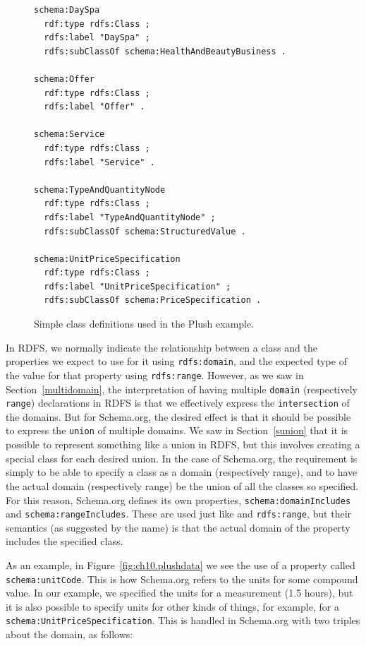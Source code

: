 \begin{figure}
\begin{lstlisting}
schema:DaySpa
  rdf:type rdfs:Class ;
  rdfs:label "DaySpa" ;
  rdfs:subClassOf schema:HealthAndBeautyBusiness .

schema:Offer
  rdf:type rdfs:Class ;
  rdfs:label "Offer" .
  
schema:Service
  rdf:type rdfs:Class ;
  rdfs:label "Service" .
  
schema:TypeAndQuantityNode
  rdf:type rdfs:Class ;
  rdfs:label "TypeAndQuantityNode" ;
  rdfs:subClassOf schema:StructuredValue .

schema:UnitPriceSpecification
  rdf:type rdfs:Class ;
  rdfs:label "UnitPriceSpecification" ;
  rdfs:subClassOf schema:PriceSpecification .
\end{lstlisting} 

    \caption{Simple class definitions used in the Plush example. }
    \label{fig:ch10.s.o.def}
\end{figure}

In RDFS, we normally indicate the relationship between a class and the properties
we expect to use for it using \texttt{rdfs:domain}, and the expected 
type of the value for that property using \texttt{rdfs:range}.  However, as we 
saw in Section~\ref{multidomain}, the interpretation of having multiple 
\texttt{domain} (respectively \texttt{range}) declarations in RDFS is that 
we effectively express the \texttt{intersection} of the domains.  But for 
Schema.org, the desired effect is that it should be possible to express the 
\texttt{union} of multiple domains.  We saw in Section~\ref{sunion} that it is 
possible to represent something like a union in RDFS, but this involves
creating a special class for each desired union.  In the case of Schema.org, 
the requirement is simply to be able to specify a class as a domain (respectively 
range), and to have the actual domain (respectively range) be the union of all 
the classes so specified.  For this reason, Schema.org defines its own 
properties, \texttt{schema:domainIncludes} and \texttt{schema:rangeIncludes}. 
These are used just like  and \texttt{rdfs:range}, but 
their semantics (as suggested by the name) is that the actual domain of 
the property includes the specified class. 

As an example, in Figure~\ref{fig:ch10.plushdata} we see the use of a property 
called \texttt{schema:unitCode}.  This is how Schema.org refers to the units
for some compound value.  In our example, we specified the units for a measurement
(1.5 hours), but it is also possible to specify units for other kinds of things, 
for example, for a \texttt{schema:UnitPriceSpecification}.  This is 
handled in Schema.org with two triples about the domain, as follows:

